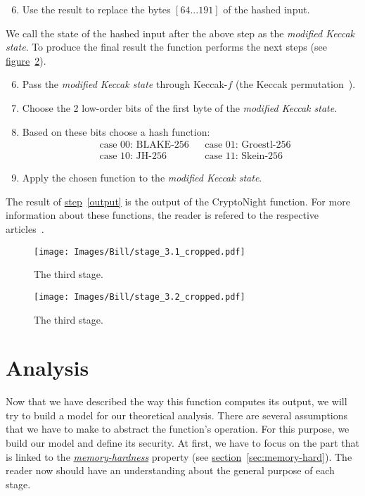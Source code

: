 \begin{enumerate}
  \setcounter{enumi}{5}
  \item \label{modified} Use the result to replace the bytes $[64...191]$ of the hashed input.
\end{enumerate}
We call the state of the hashed input after the above step as the \emph{modified Keccak state}. To produce the final result the function performs the next steps (see \hyperref[fig:stage3.1]{figure}~\ref{fig:stage3.2}).

\begin{enumerate}
  \setcounter{enumi}{5}
  \item Pass the \emph{modified Keccak state} through Keccak-$f$ (the Keccak permutation~\cite{keccak}).
  \item Choose the 2 low-order bits of the first byte of the \emph{modified Keccak state}.
  \item Based on these bits choose a hash function:
  \begin{align*}
     &\mbox{case 00: BLAKE-256} &
     &\mbox{case 01: Groestl-256}\\
     &\mbox{case 10: JH-256} &
     &\mbox{case 11: Skein-256}
  \end{align*}
  \item \label{output} Apply the chosen function to the \emph{modified Keccak state}.
\end{enumerate}
The result of \hyperref[output]{step}~\ref{output} is the output of the CryptoNight function. For more information about these functions, the reader is refered to the respective articles~\cite{10030667226,sha3groestl,sha3W09,sha3F+08}.

\begin{subfigures}
\begin{figure}[H]
  \centering
  \texttt{[image: Images/Bill/stage\_3.1\_cropped.pdf]}
  \caption{The third stage.~\cite{bill}}
  \label{fig:stage3.1}
\end{figure}
\begin{figure}[H]
  \centering
  \texttt{[image: Images/Bill/stage\_3.2\_cropped.pdf]}
  \caption{The third stage.~\cite{bill}}
  \label{fig:stage3.2}
\end{figure}
\end{subfigures}

\section{Analysis} \label{sec:analysis}
Now that we have described the way this function computes its output, we will try to build a model for our theoretical analysis. There are several assumptions that we have to make to abstract the function's operation. For this purpose, we build our model and define its security. At first, we have to focus on the part that is linked to the \hyperref[sec:memory-hard]{\emph{memory-hardness}} property (see \hyperref[sec:memory-hard]{section}~\ref{sec:memory-hard}). The reader now should have an understanding about the general purpose of each stage.


